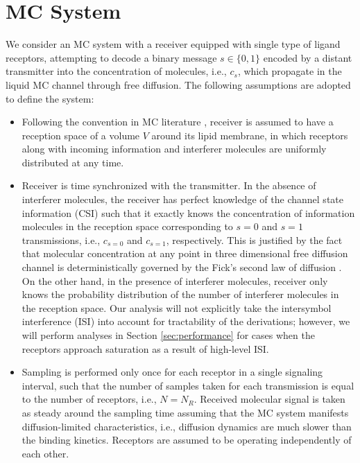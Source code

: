 \documentclass[twocolumn]{IEEEtran}
\begin{document}
\section{MC System}
\label{sec:system}
We consider an MC system with a receiver equipped with single type of ligand receptors, attempting to decode a binary message $s \in \{0,1 \}$ encoded by a distant transmitter into the concentration of molecules, i.e., $c_s$, which propagate in the liquid MC channel through free diffusion. The following assumptions are adopted to define the system:
\begin{itemize}
	\item Following the convention in MC literature \cite{pierobon2011noise}, receiver is assumed to have a reception space of a volume $V$ around its lipid membrane, in which receptors along with incoming information and interferer molecules are uniformly distributed at any time.
	
	\item Receiver is time synchronized with the transmitter. In the absence of interferer molecules, the receiver has perfect knowledge of the channel state information (CSI) such that it exactly knows the concentration of information molecules in the reception space corresponding to $s=0$ and $s=1$ transmissions, i.e., $c_{s=0}$ and $c_{s=1}$, respectively. This is justified by the fact that molecular concentration at any point in three dimensional free diffusion channel is deterministically governed by the Fick's second law of diffusion \cite{pierobon2011diffusion}. On the other hand, in the presence of interferer molecules, receiver only knows the probability distribution of the number of interferer molecules in the reception space.  Our analysis will not explicitly take the intersymbol interference (ISI) into account for tractability of the derivations; however, we will perform analyses in Section \ref{sec:performance} for cases when the receptors approach saturation as a result of high-level ISI.  
	
	\item Sampling is performed only once for each receptor in a single signaling interval, such that the number of samples taken for each transmission is equal to the number of receptors, i.e., $N = N_R$.  Received molecular signal is taken as steady around the sampling time assuming that the MC system manifests diffusion-limited characteristics, i.e., diffusion dynamics are much slower than the binding kinetics. Receptors are assumed to be operating independently of each other. 
	

\end{itemize}
\end{document}
